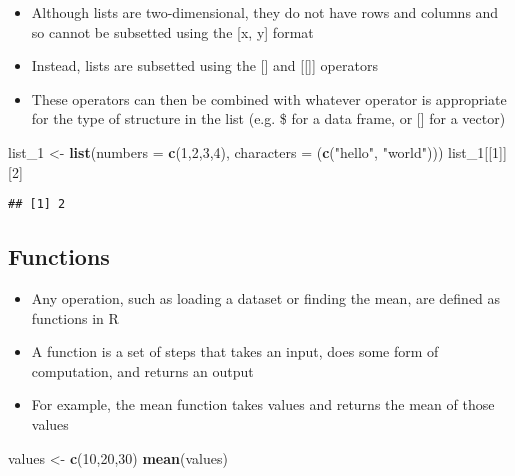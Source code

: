 \documentclass[]{article}
\newenvironment{Shaded}{\begin{snugshade}}{\end{snugshade}}
\newcommand{\KeywordTok}[1]{\textcolor[rgb]{0.13,0.29,0.53}{\textbf{#1}}}
\newcommand{\DataTypeTok}[1]{\textcolor[rgb]{0.13,0.29,0.53}{#1}}
\newcommand{\DecValTok}[1]{\textcolor[rgb]{0.00,0.00,0.81}{#1}}
\newcommand{\StringTok}[1]{\textcolor[rgb]{0.31,0.60,0.02}{#1}}
\newcommand{\NormalTok}[1]{#1}
\providecommand{\tightlist}{%
  \setlength{\itemsep}{0pt}\setlength{\parskip}{0pt}}
\begin{document}
\begin{itemize}
\tightlist
\item
  Although lists are two-dimensional, they do not have rows and columns
  and so cannot be subsetted using the {[}x, y{]} format
\item
  Instead, lists are subsetted using the {[}{]} and {[}{[}{]}{]}
  operators
\item
  These operators can then be combined with whatever operator is
  appropriate for the type of structure in the list (e.g. \$ for a data
  frame, or {[}{]} for a vector)
\end{itemize}

\begin{Shaded}
\begin{Highlighting}[]
\NormalTok{list_}\DecValTok{1}\NormalTok{ <-}\StringTok{ }\KeywordTok{list}\NormalTok{(}\DataTypeTok{numbers =} \KeywordTok{c}\NormalTok{(}\DecValTok{1}\NormalTok{,}\DecValTok{2}\NormalTok{,}\DecValTok{3}\NormalTok{,}\DecValTok{4}\NormalTok{), }\DataTypeTok{characters =}\NormalTok{ (}\KeywordTok{c}\NormalTok{(}\StringTok{"hello"}\NormalTok{, }\StringTok{"world"}\NormalTok{)))}
\NormalTok{list_}\DecValTok{1}\NormalTok{[[}\DecValTok{1}\NormalTok{]][}\DecValTok{2}\NormalTok{]}
\end{Highlighting}
\end{Shaded}

\begin{verbatim}
## [1] 2
\end{verbatim}

\subsection{Functions}\label{functions}

\begin{itemize}
\tightlist
\item
  Any operation, such as loading a dataset or finding the mean, are
  defined as functions in R
\item
  A function is a set of steps that takes an input, does some form of
  computation, and returns an output
\item
  For example, the mean function takes values and returns the mean of
  those values
\end{itemize}

\begin{Shaded}
\begin{Highlighting}[]
\NormalTok{values <-}\StringTok{ }\KeywordTok{c}\NormalTok{(}\DecValTok{10}\NormalTok{,}\DecValTok{20}\NormalTok{,}\DecValTok{30}\NormalTok{)}
\KeywordTok{mean}\NormalTok{(values)}
\end{Highlighting}
\end{Shaded}
\end{document}
